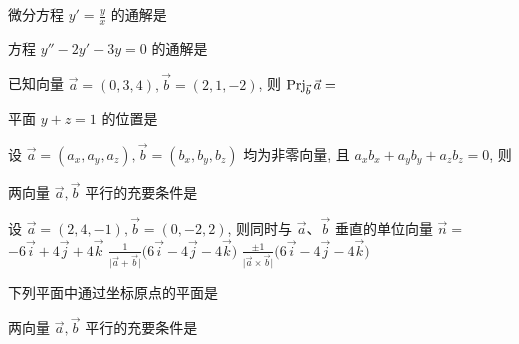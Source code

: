 \begin{ti}
	微分方程 $y' = \frac{y}{x}$ 的通解是 \kuo
\end{ti}

\begin{ti}
	方程 $y'' - 2y' - 3y = 0$ 的通解是 \kuo
\end{ti}

\begin{ti}
	已知向量 $\vec a = (0,3,4), \vec b = (2,1,-2)$, 则 $\operatorname{Prj}_{\vec b} \vec a = $ \kuo
\end{ti}

\begin{ti}
	平面 $y + z = 1$ 的位置是 \kuo
\end{ti}

\begin{ti}
	设 $\vec a = (a_x,a_y,a_z), \vec b = (b_x,b_y,b_z)$ 均为非零向量, 且 $a_x b_x + a_y b_y + a_z b_z = 0$, 则 \kuo
\end{ti}

\begin{ti}
	两向量 $\vec a, \vec b$ 平行的充要条件是 \kuo
\end{ti}

\begin{ti}
	设 $\vec a = (2,4,-1), \vec b = (0,-2,2)$, 则同时与 $\vec a$、$\vec b$ 垂直的单位向量 $\vec n = $ \kuo
	{$- 6 \vec i + 4 \vec j + 4 \vec k$}
	{$\frac{1}{\bigl| \vec a + \vec b \bigr|} \bigl( 6 \vec i - 4 \vec j - 4 \vec k \bigr)$}
	{$\frac{\pm 1}{\bigl| \vec a \times \vec b \bigr|} \bigl( 6 \vec i - 4 \vec j - 4 \vec k \bigr)$}
\end{ti}

\begin{ti}
	下列平面中通过坐标原点的平面是 \kuo
\end{ti}

\begin{ti}
	两向量 $\vec a, \vec b$ 平行的充要条件是 \kuo
\end{ti}

